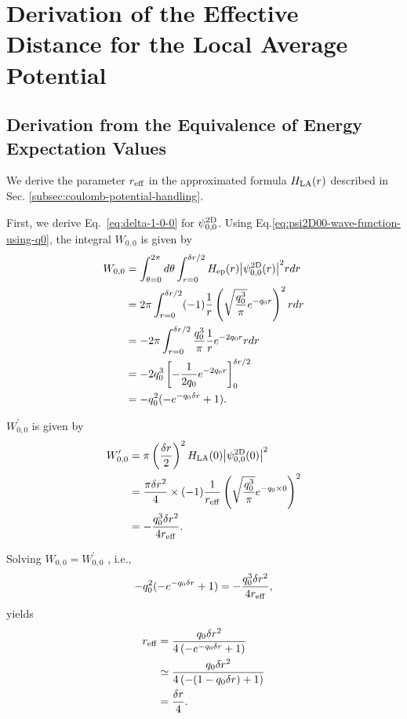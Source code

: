 \documentclass[aip-draft.tex]{subfiles}
\begin{document}
\appendix
\section{Derivation of the Effective Distance for the Local Average Potential}
\label{chap:appendix_derivation_derivation}
\subsection{Derivation from the Equivalence of Energy Expectation Values}
We derive the parameter $r_{\mathrm{eff}}$ in the approximated formula
$H_{\mathrm{LA}}(r)$ described in Sec. \ref{subsec:coulomb-potential-handling}.

First, we derive Eq.~\eqref{eq:delta-1-0-0} for $\psi^{\mathrm{2D}}_{0,0}$.
Using Eq.\eqref{eq:psi2D00-wave-function-using-q0}, the integral $W_{0,0}$ is given by
\begin{align}
  W_{0,0}
   &= \int_{\theta=0}^{2\pi}d\theta
      \int_{r=0}^{\delta r/2}
      H_{\mathrm{ep}}(r){\left| \psi^{\mathrm{2D}}_{0,0}(r) \right|}^2r dr\notag\\
   &= 2\pi \int_{r=0}^{\delta r/2}
      (-1)\frac{1}{r} \left(\sqrt{\frac{q_0^3}{\pi}}e^{-q_0 r}\right)^2 r dr \notag\\
   &= -2\pi\int_{r=0}^{\delta r/2}\frac{q_0^3}{\pi}\frac{1}{r}e^{-2q_0r} r dr \notag\\
   &= -2q_0^3 \left[-\frac{1}{2q_0}e^{-2q_0r}\right]_{0}^{\delta r/2}\notag\\
   &=-q_0^2(-e^{-q_0\delta r}+1) .
\end{align}

$W_{0,0}^\prime$ is given by
\begin{align}
    W_{0,0}^\prime
    &=\pi\left(\frac{\delta r}{2}\right)^2 H_{\mathrm{LA}}(0){\left| \psi^{\mathrm{2D}}_{0,0}(0) \right|}^2\notag\\
    &=\frac{\pi\delta r^2}{4}\times(-1)\frac{1}{r_{\mathrm{eff}}} \left(\sqrt{\frac{q_0^3}{\pi}}e^{-q_0\times0}\right)^2 \notag\\
    &= -\frac{q_0^3\delta r^2}{4r_{\mathrm{eff}}} .
\end{align}

Solving $W_{0,0}=W_{0,0}^\prime$ , i.e., 
\begin{equation}
  -q_0^2(-e^{-q_0\delta r}+1) = -\frac{q_0^3\delta r^2}{4r_{\mathrm{eff}}},
\end{equation}
yields
\begin{align}
r_{\mathrm{eff}} &= \frac{q_0\delta r^2}{4\left(-e^{-q_0\delta r}+1\right)}\notag\\
      &\simeq \frac{q_0 \delta r^2}{4\left(-(1-q_0\delta r)+1\right)}\notag\\
&=\frac{\delta r}{4} .
\end{align}
\end{document}
